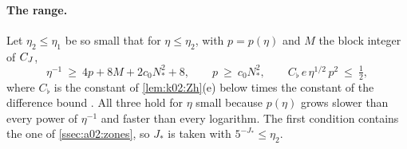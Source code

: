 \paragraph{The range.} Let $\eta_2\le\eta_1$ be so small that for $\eta\le\eta_2$, with $p=p(\eta)$ and $M$ the block integer of $C_J$,
\begin{equation}\label{eq:k02:range}
\eta^{-1}\ \ge\ 4p+8M+2c_0N_*^2+8,\qquad p\ \ge\ c_0N_*^2,\qquad C_\flat\,e\,\eta^{1/2}\,p^{2}\ \le\ \tfrac12,
\end{equation}
where $C_\flat$ is the constant of \cref{lem:k02:Zh}(e) below times the constant of the difference bound \cite[(3.45)]{K1}. All three hold for $\eta$ small because $p(\eta)$ grows slower than every power of $\eta^{-1}$ and faster than every logarithm. The first condition contains the one of \cref{ssec:a02:zones}, so $J_*$ is taken with $5^{-J_*}\le\eta_2$.

